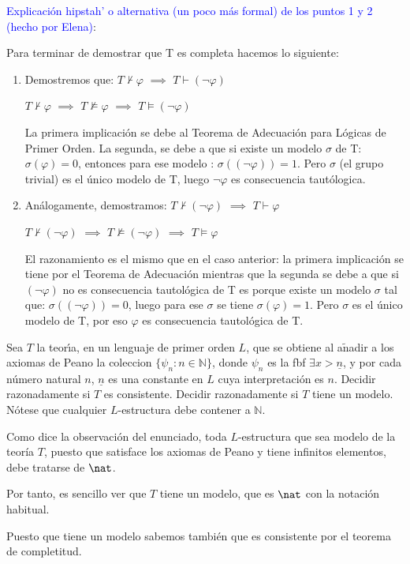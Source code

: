 \begin{problem}
\textcolor{blue}{Explicación hipstah' o alternativa (un poco más formal) de los puntos 1 y 2 (hecho por Elena)}:

Para terminar de demostrar que T es completa hacemos lo siguiente:
\begin{enumerate}

\item Demostremos que: $T \nvdash \varphi $ $\implies$ $T \vdash (\neg \varphi)$ 

$T \nvdash \varphi $ $\implies$ $T \nvDash \varphi $ $\implies$ $T \vDash (\neg \varphi)$

La primera implicación se debe al Teorema de Adecuación para Lógicas de Primer Orden. La segunda, se debe a que si existe un modelo $\sigma$ de T: $\sigma(\varphi) = 0$, entonces para ese modelo : $\sigma((\neg \varphi)) = 1$. Pero $\sigma$ (el grupo trivial) es el único modelo de T, luego $\neg \varphi$ es consecuencia tautólogica.

\item Análogamente, demostramos: $T \nvdash (\neg \varphi) $ $\implies$ $T \vdash \varphi$

$T \nvdash (\neg\varphi) $ $\implies$ $T \nvDash (\neg \varphi) $ $\implies$ $T \vDash  \varphi$

El razonamiento es el mismo que en el caso anterior: la primera implicación se tiene por el Teorema de Adecuación mientras que la segunda se debe a que si $(\neg \varphi)$ no es consecuencia tautológica de T es porque existe un modelo $\sigma$ tal que: $\sigma((\neg \varphi)) = 0$, luego para ese $\sigma$ se tiene $\sigma(\varphi)=1$. Pero $\sigma$ es el único modelo de T, por eso $\varphi$ es consecuencia tautológica de T. 
\end{enumerate}

\end{problem}

\begin{problem} Sea $T$ la teor\'{\i}a, 
 en un lenguaje de primer orden  $L$, que se obtiene al a$\operatorname{\tilde{n}}$adir a los
axiomas de Peano la coleccion $\{ \psi_n: n\in\mathbb{N}\}$, donde
$\psi_n$ es la fbf $\exists x > \underline{n}$,  y  por cada n\'umero natural $n$,  $ \underline{n}$ es una constante
en $L$ cuya interpretaci\'on es $n$.
 Decidir razonadamente si 
$T$ es consistente. Decidir razonadamente si $T$ tiene un modelo. 
\obs N\'otese que  cualquier
$L$-estructura debe contener a $\mathbb{N}$.
\solution


Como dice la observación del enunciado, toda $L$-estructura que sea modelo de la teoría $T$, puesto que satisface los axiomas de Peano y tiene infinitos elementos, debe tratarse de $\nat$.

Por tanto, es sencillo ver que $T$ tiene un modelo, que es $\nat$ con la notación habitual.

Puesto que tiene un modelo sabemos también que es consistente por el teorema de completitud.

\end{problem}